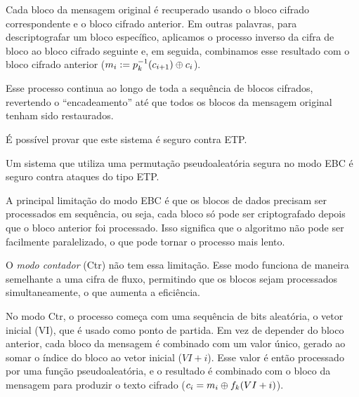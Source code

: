 Cada bloco da mensagem original é recuperado usando o bloco cifrado correspondente e o bloco cifrado anterior.
Em outras palavras, para descriptografar um bloco específico, aplicamos o processo inverso da cifra de bloco ao bloco cifrado seguinte e, em seguida, combinamos esse resultado com o bloco cifrado anterior ($m_{i}  :=  p_k^{-1}(c_{i+1}) \oplus c_{i}$).

Esse processo continua ao longo de toda a sequência de blocos cifrados, revertendo o ``encadeamento'' até que todos os blocos da mensagem original tenham sido restaurados.

É possível provar que este sistema é seguro contra ETP.

\begin{theorem}
Um sistema que utiliza uma permutação pseudoaleatória segura no modo EBC é seguro contra ataques do tipo ETP.
\end{theorem}


A principal limitação do modo EBC é que os blocos de dados precisam ser processados em sequência, ou seja, cada bloco só pode ser criptografado depois que o bloco anterior foi processado.
Isso significa que o algoritmo não pode ser facilmente paralelizado, o que pode tornar o processo mais lento.

O {\em modo contador} (Ctr) não tem essa limitação.
Esse modo funciona de maneira semelhante a uma cifra de fluxo, permitindo que os blocos sejam processados simultaneamente, o que aumenta a eficiência.

No modo Ctr, o processo começa com uma sequência de bits aleatória, o vetor inicial (VI), que é usado como ponto de partida.
Em vez de depender do bloco anterior, cada bloco da mensagem é combinado com um valor único, gerado ao somar o índice do bloco ao vetor inicial ($VI + i$).
Esse valor é então processado por uma função pseudoaleatória, e o resultado é combinado com o bloco da mensagem para produzir o texto cifrado ($c_i = m_i \oplus f_k(VI + i)$).

\begin{center}
\end{center}

